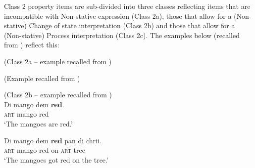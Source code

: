 Class 2 property items are sub-divided into three classes reflecting items that are incompatible with Non-stative expression (Class 2a), those that allow for a (Non-stative) Change of state interpretation (Class 2b) and those that allow for a (Non-stative) Process interpretation (Class 2c). The examples below (recalled from ) reflect this:

\ea%
 \label{ex:6:5}
 (Class 2a -- example  recalled from )\\
 


\z
\z

\ea%
 \label{ex:6:6}
(Example  recalled from )\\


\z
\z

\ea%
 \label{ex:6:7}
 (Class 2b -- example  recalled from )\\
\ea
\gll Di mango dem \textbf{red}.\\
\textsc{art} mango {\PL} red\\
\glt `The mangoes are red.'

\ex
\gll Di mango dem \textbf{red} pan di chrii.\\
\textsc{art} mango {\PL} red on \textsc{art} tree\\
\glt `The mangoes got red on the tree.'


